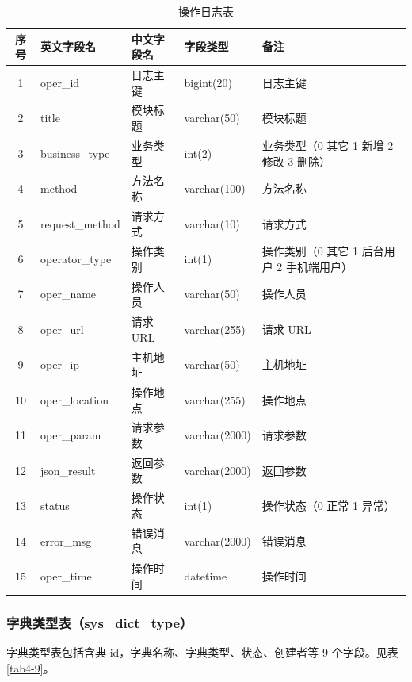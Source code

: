 \documentclass{izdthesis}
\begin{document}
\begin{table}[H]
  \centering
  \caption{操作日志表}
  \label{tab4-8}
  \songti
  \begin{tabular}{c l l l p{4.5cm}}
    \toprule
    序号 & 英文字段名 & 中文字段名 & 字段类型 & 备注 \\
    \midrule
    1 & oper\_id & 日志主键 & bigint(20) & 日志主键 \\
    2 & title & 模块标题 & varchar(50) & 模块标题 \\
    3 & business\_type & 业务类型 & int(2) & 业务类型（0 其它 1 新增 2 修改 3 删除） \\
    4 & method & 方法名称 & varchar(100) & 方法名称 \\
    5 & request\_method & 请求方式 & varchar(10) & 请求方式 \\
    6 & operator\_type & 操作类别 & int(1) & 操作类别（0 其它 1 后台用户 2 手机端用户） \\
    7 & oper\_name & 操作人员 & varchar(50) & 操作人员 \\
    8 & oper\_url & 请求 URL & varchar(255) & 请求 URL \\
    9 & oper\_ip & 主机地址 & varchar(50) & 主机地址 \\
    10 & oper\_location & 操作地点 & varchar(255) & 操作地点 \\
    11 & oper\_param & 请求参数 & varchar(2000) & 请求参数 \\
    12 & json\_result & 返回参数 & varchar(2000) & 返回参数 \\
    13 & status & 操作状态 & int(1) & 操作状态（0 正常 1 异常） \\
    14 & error\_msg & 错误消息 & varchar(2000) & 错误消息 \\
    15 & oper\_time & 操作时间 & datetime & 操作时间 \\
    \bottomrule
  \end{tabular}
\end{table}

\subsubsection{字典类型表（sys\_dict\_type）}
字典类型表包括含典 id，字典名称、字典类型、状态、创建者等 9 个字段。见表 \ref{tab4-9}。
\end{document}
